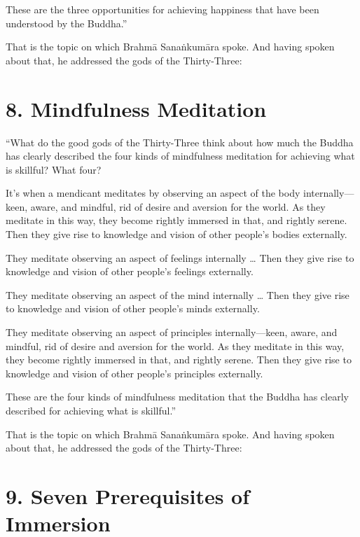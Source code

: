 \documentclass[12pt,openany]{book}%
\begin{document}
These are the three opportunities for achieving happiness that have been understood by the Buddha.” 

That is the topic on which \textsanskrit{Brahmā} \textsanskrit{Sanaṅkumāra} spoke. And having spoken about that, he addressed the gods of the Thirty-Three: 

\section*{8. Mindfulness Meditation }

“What do the good gods of the Thirty-Three think about how much the Buddha has clearly described the four kinds of mindfulness meditation for achieving what is skillful? What four? 

It’s when a mendicant meditates by observing an aspect of the body internally—keen, aware, and mindful, rid of desire and aversion for the world. As they meditate in this way, they become rightly immersed in that, and rightly serene. Then they give rise to knowledge and vision of other people’s bodies externally. 

They meditate observing an aspect of feelings internally … Then they give rise to knowledge and vision of other people’s feelings externally. 

They meditate observing an aspect of the mind internally … Then they give rise to knowledge and vision of other people’s minds externally. 

They meditate observing an aspect of principles internally—keen, aware, and mindful, rid of desire and aversion for the world. As they meditate in this way, they become rightly immersed in that, and rightly serene. Then they give rise to knowledge and vision of other people’s principles externally. 

These are the four kinds of mindfulness meditation that the Buddha has clearly described for achieving what is skillful.” 

That is the topic on which \textsanskrit{Brahmā} \textsanskrit{Sanaṅkumāra} spoke. And having spoken about that, he addressed the gods of the Thirty-Three: 

\section*{9. Seven Prerequisites of Immersion }
\end{document}
